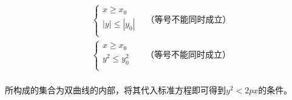 \documentclass[UTF8]{ctexart}
\begin{document}
    \setcounter{equation}{0}
    \begin{align}
        &\begin{cases}
            x\geq x_0\\[1mm]
            |y|\leq|y_0|\\[1mm]
        \end{cases}~~~~\text{（等号不能同时成立）}\\[6mm]
        &\begin{cases}
            x\geq x_0\\[1mm]
            y^2\leq y_0^2\\[1mm]
        \end{cases}~~~~~~~\text{（等号不能同时成立）}
    \end{align}\\
    所构成的集合为双曲线的内部，将其代入标准方程即可得到$y^2<2px$的条件。

\newpage
\end{document}
